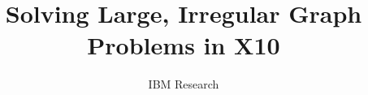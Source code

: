 \documentclass{ieee}
\numberwithin{equation}{section}
\begin{document}
\title{Solving Large, Irregular Graph Problems in X10}

\author{IBM Research}

\maketitle
\thispagestyle{empty}











\end{document}
